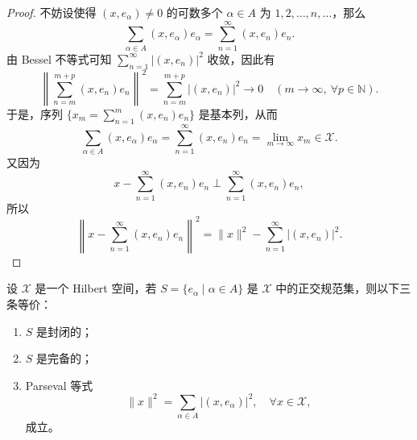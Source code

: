\documentclass[lang=cn,newtx,10pt,scheme=chinese,thmcnt=chapter]{elegantbook}
\begin{document}
\begin{proof}
不妨设使得 $\left(x, e_\alpha\right) \neq 0$ 的可数多个 $\alpha \in A$ 为 $1, 2, \dots, n, \dots$，那么
\begin{equation*}
\sum_{\alpha \in A}\left(x, e_\alpha\right)e_\alpha = \sum_{n=1}^\infty\left(x, e_n\right)e_n.
\end{equation*}
由 Bessel 不等式可知 $\sum\limits_{n=1}^\infty\left|\left(x, e_n\right)\right|^2$ 收敛，因此有
\begin{equation*}
\left\|\sum_{n=m}^{m+p}\left(x, e_n\right)e_n\right\|^2 = \sum_{n=m}^{m+p}\left|\left(x, e_n\right)\right|^2 \to 0 \quad (m \to \infty, \ \forall p \in \mathbb{N}).
\end{equation*}
于是，序列 $\{x_m = \sum\limits_{n=1}^m\left(x, e_n\right)e_n\}$ 是基本列，从而
\begin{equation*}
\sum_{\alpha \in A}\left(x, e_\alpha\right)e_\alpha = \sum_{n=1}^\infty\left(x, e_n\right)e_n = \lim_{m \to \infty}x_m \in \mathscr{X}.
\end{equation*}
又因为
\begin{equation*}
x - \sum_{n=1}^\infty\left(x, e_n\right)e_n \perp \sum_{n=1}^\infty\left(x, e_n\right)e_n,
\end{equation*}
所以
\begin{equation*}
\left\|x - \sum_{n=1}^\infty\left(x, e_n\right)e_n\right\|^2 = \|x\|^2 - \sum_{n=1}^\infty\left|\left(x, e_n\right)\right|^2.
\end{equation*}
\end{proof}
\begin{theorem}
设 $\mathscr{X}$ 是一个 Hilbert 空间，若 $S = \{e_\alpha \mid \alpha \in A\}$ 是 $\mathscr{X}$ 中的正交规范集，则以下三条等价：
\begin{enumerate}
    \item[(1)] $S$ 是封闭的；
    \item[(2)] $S$ 是完备的；
    \item[(3)] Parseval 等式
    \begin{equation}
    \|x\|^2 = \sum_{\alpha \in A}\left|\left(x, e_\alpha\right)\right|^2, \quad \forall x \in \mathscr{X},
    \end{equation}
    成立。
\end{enumerate}
\end{theorem}
\end{document}
